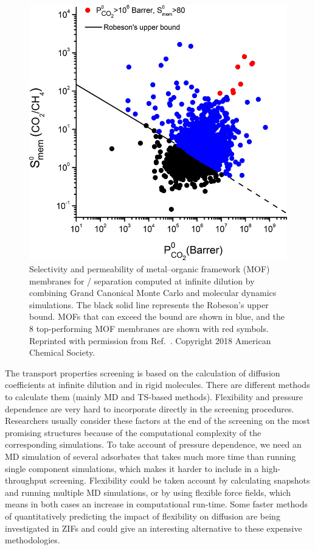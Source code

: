 \documentclass[main.tex]{subfiles}
\begin{document}
\begin{figure}[ht]
\centering
  \includegraphics[width=0.5\linewidth]{figures/1-screening/Altintas_2018.jpeg}
  \caption{Selectivity and permeability of metal--organic framework (MOF) membranes for / separation computed at infinite dilution by combining Grand Canonical Monte Carlo and molecular dynamics simulations.\cite{Altintas_2018} The black solid line represents the Robeson's upper bound.\cite{robeson1991correlation, Robeson_2008} MOFs that can exceed the bound are shown in blue, and the 8 top-performing MOF membranes are shown with red symbols. Reprinted with permission from Ref.~. Copyright 2018 American Chemical Society.}
  \label{fgr:Altintas_2018}
\end{figure}

The transport properties screening is based on the calculation of diffusion coefficients at infinite dilution and in rigid molecules. There are different methods to calculate them (mainly MD and TS-based methods). Flexibility and pressure dependence are very hard to incorporate directly in the screening procedures. Researchers usually consider these factors at the end of the screening on the most promising structures because of the computational complexity of the corresponding simulations. {To take account of} pressure dependence, {we need} an MD simulation of several adsorbates { that takes much more time than running single component simulations},\cite{Keskin_2007, Keskin_2009} which {makes it harder to include in a} high-throughput screening. Flexibility could be taken account by calculating snapshots and running multiple MD simulations, or by using flexible force fields, which means in both cases an increase in computational run-time. Some faster methods of quantitatively predicting the impact of flexibility on diffusion are being investigated in ZIFs and could give an interesting alternative to these expensive methodologies.\cite{Han_2020}
\end{document}
